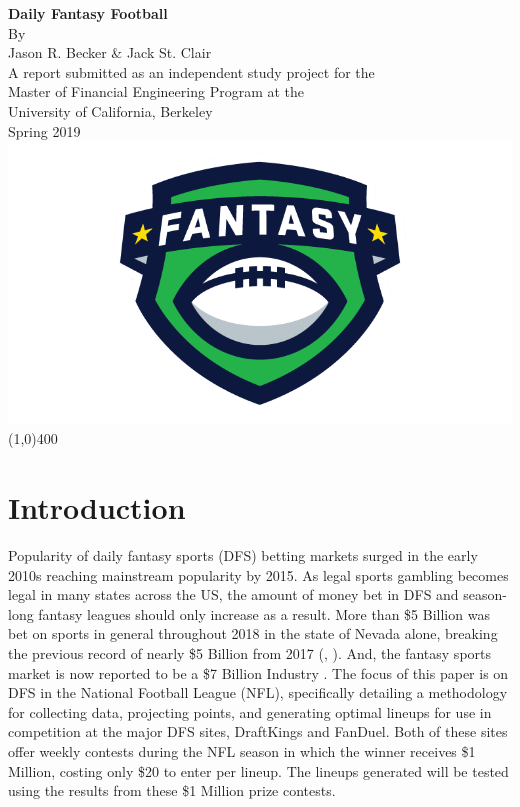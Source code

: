 \documentclass[12pt]{article}
\begin{document}
\begin{titlepage}
	\begin{center}
	\vspace*{4cm}
	\huge{\textbf{Daily Fantasy Football}}\\[2cm]
	\Large{By\\[2mm] Jason R. Becker \& Jack St. Clair}\\[2cm]
	\large{A report submitted as an independent study project for the\\
		Master of Financial Engineering Program at the\\
		 University of California, Berkeley}\\[1cm]	
	\Large{Spring 2019}\\[2cm]
	\includegraphics[scale=0.3]{../figures/fantasy_logo}
	\vfill
	\line(1,0){400}
	\end{center}
\end{titlepage}


\section{Introduction}
Popularity of daily fantasy sports (DFS) betting markets surged in the early 2010s reaching mainstream popularity by 2015. As legal sports gambling becomes legal in many states across the US, the amount of money bet in DFS and season-long fantasy leagues should only increase as a result. More than \$5 Billion was bet on sports in general throughout 2018 in the state of Nevada alone, breaking the previous record of nearly \$5 Billion from 2017 (\cite{nevada 2018}, \cite{nevada 2017}). And, the fantasy sports market is now reported to be a \$7 Billion Industry \cite{market size}. The focus of this paper is on DFS in the National Football League (NFL), specifically detailing a methodology for collecting data, projecting points, and generating optimal lineups for use in competition at the major DFS sites, DraftKings and FanDuel. Both of these sites offer weekly contests during the NFL season in which the winner receives \$1 Million, costing only \$20 to enter per lineup. The lineups generated will be tested using the results from these \$1 Million prize contests. \bigskip
\end{document}
